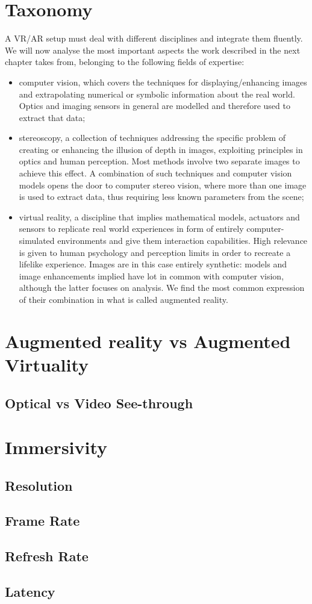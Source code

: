 \section{Taxonomy}

A VR/AR setup must deal with different disciplines and integrate them fluently. We will now analyse the most important aspects the work described in the next chapter takes from, belonging to the following fields of expertise:
\begin{itemize}
\item
computer vision, which covers the techniques for displaying/enhancing images and extrapolating numerical or symbolic information about the real world. Optics and imaging sensors in general are modelled and therefore used to extract that data;
\item
stereoscopy, a collection of techniques addressing the specific problem of creating or enhancing the illusion of depth in images, exploiting principles in optics and human perception. Most methods involve two separate images to achieve this effect. A combination of such techniques and computer vision models opens the door to computer stereo vision, where more than one image is used to extract data, thus requiring less known parameters from the scene;
\item
virtual reality, a discipline that implies mathematical models, actuators and sensors to replicate real world experiences in form of entirely computer-simulated environments and give them interaction capabilities. High relevance is given to human psychology and perception limits in order to recreate a lifelike experience. Images are in this case entirely synthetic: models and image enhancements implied have lot in common with computer vision, although the latter focuses on analysis. We find the most common expression of their combination in what is called augmented reality.
\end{itemize}

\section{Augmented reality vs Augmented Virtuality}


\subsection{Optical vs Video See-through} %

\section{Immersivity}

\subsection{Resolution}
\subsection{Frame Rate}
\subsection{Refresh Rate}
\subsection{Latency}

